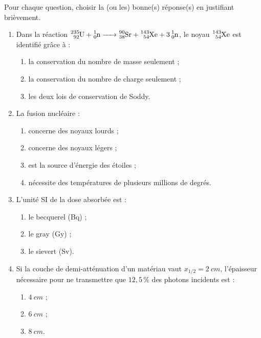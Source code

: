 \documentclass[11pt]{article}
\begin{document}
\begin{exercice}
Pour chaque question, choisir la (ou les) bonne(s) réponse(s) en justifiant brièvement.
\begin{enumerate}
\item Dans la réaction $\ce{^{235}_{92}U + ^{1}_{0}n -> ^{90}_{38}Sr + ^{143}_{54}Xe + 3^{1}_{0}n}$, le noyau $\ce{^{143}_{54}Xe}$ est identifié grâce à :
\begin{enumerate}
\item la conservation du nombre de masse seulement ;
\item la conservation du nombre de charge seulement ;
\item les deux lois de conservation de Soddy.
\end{enumerate}
\item La fusion nucléaire :
\begin{enumerate}
\item concerne des noyaux lourds ;
\item concerne des noyaux légers ;
\item est la source d'énergie des étoiles ;
\item nécessite des températures de plusieurs millions de degrés.
\end{enumerate}
\item L'unité SI de la dose absorbée est :
\begin{enumerate}
\item le becquerel (Bq) ; \item le gray (Gy) ; \item le sievert (Sv).
\end{enumerate}
\item Si la couche de demi-atténuation d'un matériau vaut $x_{1/2} = \SI{2}{cm}$, l'épaisseur nécessaire pour ne transmettre que $12,5\,\%$ des photons incidents est :
\begin{enumerate}
\item $\SI{4}{cm}$ ; \item $\SI{6}{cm}$ ; \item $\SI{8}{cm}$.
\end{enumerate}
\end{enumerate}
\end{exercice}
\end{document}
